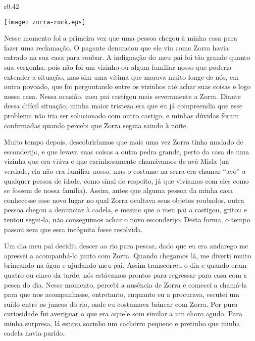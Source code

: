 \ifdefined\EnableIncludeImages
\begin{wrapfigure}{r}{0.42\textwidth}
  \begin{center}
  \vspace{-10pt}
    \texttt{[image: zorra-rock.eps]}
  \end{center}
  \vspace{-20pt}
\end{wrapfigure}
\fi
Nesse momento foi a primeira vez que uma pessoa chegou à minha casa para fazer uma reclamação. O pagante denunciou que ele viu como Zorra havia entrado na sua casa para roubar. 
A indignação do meu pai foi tão grande quanto sua vergonha, pois não foi um vizinho ou algum familiar nosso que poderia entender a situação, mas sim uma vítima que morava muito longe de nós, em outro povoado, que foi perguntando entre os vizinhos até achar suas coisas e logo nossa casa.
Nessa ocasião, meu pai castigou mais severamente a Zorra. Diante dessa difícil situação, minha maior tristeza era que eu já compreendia que esse problema não iria ser solucionado com outro castigo, e minhas dúvidas foram confirmadas quando percebi que Zorra seguia saindo à noite. 

Muito tempo depois, descobriríamos que mais uma vez Zorra tinha mudado de esconderijo, e que levava suas coisas a outra pedra grande, perto da casa de uma vizinha que era viúva e que carinhosamente chamávamos de avó Misla (na verdade, ela não era familiar nosso, mas o costume na serra era chamar ``avó'' a qualquer pessoa de idade, como sinal de respeito, já que vivíamos com eles como se fossem de nossa família).
Assim, antes que alguma pessoa da minha casa conhecesse esse novo lugar no qual Zorra ocultava seus objetos roubados, outra pessoa chegou a denunciar à cadela, e mesmo que o meu pai a castigou, gritou e tentou segui-la, não conseguimos achar o novo esconderijo. Desta forma, o tempo passou sem que essa incógnita fosse resolvida. 

Um dia meu pai decidiu descer ao rio para pescar, dado que eu era andarego me apressei a acompanhá-lo junto com Zorra. 
Quando chegamos lá, me diverti muito brincando na água e ajudando meu pai. Assim transcorreu o dia e quando eram quatro ou cinco da tarde, nós estávamos prontos para regressar para casa com a pesca do dia.
Nesse momento, percebi a ausência de Zorra e comecei a chamá-la para que nos acompanhasse, 
entretanto, enquanto eu a procurava, escutei um ruído entre os juncos do rio, onde eu costumava brincar com Zorra. 
Por pura curiosidade fui averiguar o que era aquele som similar a um choro agudo. Para minha surpresa, lá estava sozinho um cachorro pequeno e pretinho que minha cadela havia parido. 
 

